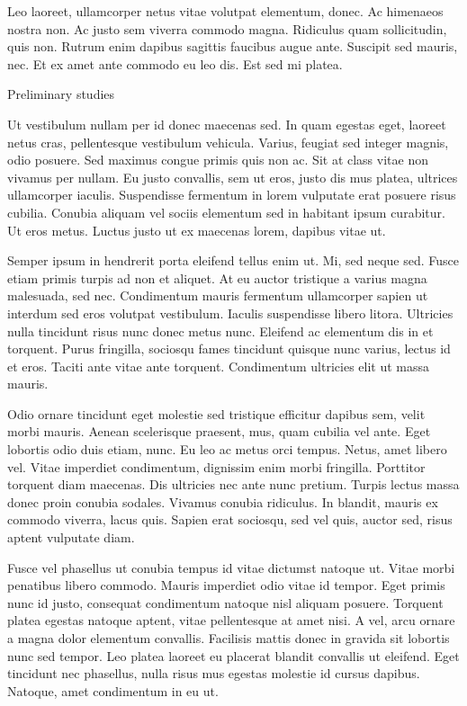 \documentclass[11pt,]{article}
\makeatletter
\renewcommand\subsubsection{
  \@startsection{subsubsection}{3}{\z@}
    {-3.25ex\@plus -1ex \@minus -.2ex}
    {1.5ex \@plus .2ex}
    {\normalfont\normalsize\bf}} %
\makeatother
\begin{document}
Leo laoreet, ullamcorper netus vitae volutpat elementum, donec. Ac
himenaeos nostra non. Ac justo sem viverra commodo magna. Ridiculus quam
sollicitudin, quis non. Rutrum enim dapibus sagittis faucibus augue
ante. Suscipit sed mauris, nec. Et ex amet ante commodo eu leo dis. Est
sed mi platea.

\hypertarget{preliminary-studies}{%
\subsubsection{Preliminary studies}\label{preliminary-studies}}

Ut vestibulum nullam per id donec maecenas sed. In quam egestas eget,
laoreet netus cras, pellentesque vestibulum vehicula. Varius, feugiat
sed integer magnis, odio posuere. Sed maximus congue primis quis non ac.
Sit at class vitae non vivamus per nullam. Eu justo convallis, sem ut
eros, justo dis mus platea, ultrices ullamcorper iaculis. Suspendisse
fermentum in lorem vulputate erat posuere risus cubilia. Conubia aliquam
vel sociis elementum sed in habitant ipsum curabitur. Ut eros metus.
Luctus justo ut ex maecenas lorem, dapibus vitae ut.

Semper ipsum in hendrerit porta eleifend tellus enim ut. Mi, sed neque
sed. Fusce etiam primis turpis ad non et aliquet. At eu auctor tristique
a varius magna malesuada, sed nec. Condimentum mauris fermentum
ullamcorper sapien ut interdum sed eros volutpat vestibulum. Iaculis
suspendisse libero litora. Ultricies nulla tincidunt risus nunc donec
metus nunc. Eleifend ac elementum dis in et torquent. Purus fringilla,
sociosqu fames tincidunt quisque nunc varius, lectus id et eros. Taciti
ante vitae ante torquent. Condimentum ultricies elit ut massa mauris.

Odio ornare tincidunt eget molestie sed tristique efficitur dapibus sem,
velit morbi mauris. Aenean scelerisque praesent, mus, quam cubilia vel
ante. Eget lobortis odio duis etiam, nunc. Eu leo ac metus orci tempus.
Netus, amet libero vel. Vitae imperdiet condimentum, dignissim enim
morbi fringilla. Porttitor torquent diam maecenas. Dis ultricies nec
ante nunc pretium. Turpis lectus massa donec proin conubia sodales.
Vivamus conubia ridiculus. In blandit, mauris ex commodo viverra, lacus
quis. Sapien erat sociosqu, sed vel quis, auctor sed, risus aptent
vulputate diam.

Fusce vel phasellus ut conubia tempus id vitae dictumst natoque ut.
Vitae morbi penatibus libero commodo. Mauris imperdiet odio vitae id
tempor. Eget primis nunc id justo, consequat condimentum natoque nisl
aliquam posuere. Torquent platea egestas natoque aptent, vitae
pellentesque at amet nisi. A vel, arcu ornare a magna dolor elementum
convallis. Facilisis mattis donec in gravida sit lobortis nunc sed
tempor. Leo platea laoreet eu placerat blandit convallis ut eleifend.
Eget tincidunt nec phasellus, nulla risus mus egestas molestie id cursus
dapibus. Natoque, amet condimentum in eu ut.
\end{document}
